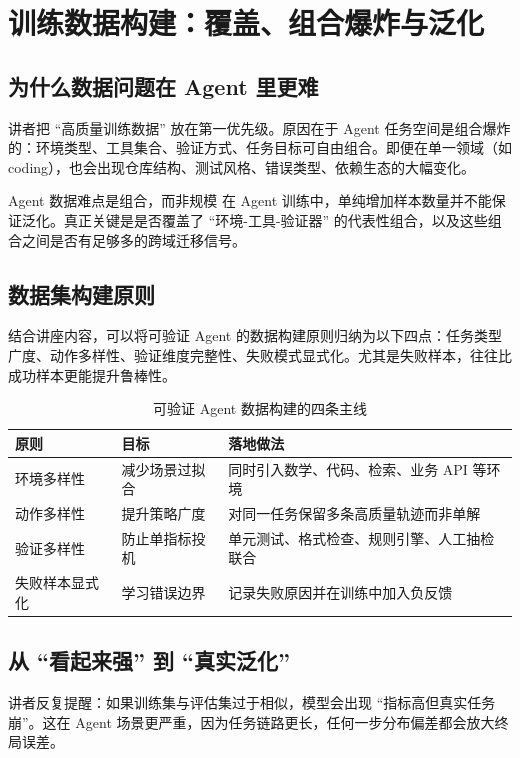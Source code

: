\section{训练数据构建：覆盖、组合爆炸与泛化}

\subsection{为什么数据问题在 Agent 里更难}
讲者把 ``高质量训练数据'' 放在第一优先级。原因在于 Agent 任务空间是组合爆炸的：环境类型、工具集合、验证方式、任务目标可自由组合。即便在单一领域（如 coding），也会出现仓库结构、测试风格、错误类型、依赖生态的大幅变化。

\begin{importantbox}{Agent 数据难点是组合，而非规模}
在 Agent 训练中，单纯增加样本数量并不能保证泛化。真正关键是是否覆盖了 ``环境-工具-验证器'' 的代表性组合，以及这些组合之间是否有足够多的跨域迁移信号。
\end{importantbox}

\subsection{数据集构建原则}
结合讲座内容，可以将可验证 Agent 的数据构建原则归纳为以下四点：任务类型广度、动作多样性、验证维度完整性、失败模式显式化。尤其是失败样本，往往比成功样本更能提升鲁棒性。

\begin{table}[H]
\centering
\begin{tabular}{p{2.4cm}p{3.7cm}p{5.4cm}}
\toprule
\textbf{原则} & \textbf{目标} & \textbf{落地做法} \\
\midrule
环境多样性 & 减少场景过拟合 & 同时引入数学、代码、检索、业务 API 等环境 \\
动作多样性 & 提升策略广度 & 对同一任务保留多条高质量轨迹而非单解 \\
验证多样性 & 防止单指标投机 & 单元测试、格式检查、规则引擎、人工抽检联合 \\
失败样本显式化 & 学习错误边界 & 记录失败原因并在训练中加入负反馈 \\
\bottomrule
\end{tabular}
\caption{可验证 Agent 数据构建的四条主线}
\end{table}

\subsection{从 ``看起来强'' 到 ``真实泛化''}
讲者反复提醒：如果训练集与评估集过于相似，模型会出现 ``指标高但真实任务崩''。这在 Agent 场景更严重，因为任务链路更长，任何一步分布偏差都会放大终局误差。

